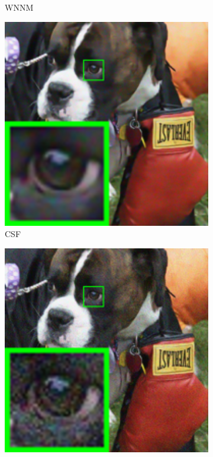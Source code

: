\begin{figure}
\begin{subfigure}[t]{0.19\textwidth}
\caption{WNNM}
    \end{subfigure}
    \hfill
    \begin{subfigure}[t]{0.19\textwidth}
        \centering
        \includegraphics[width=1\textwidth]{images/guided/resize_br_CSF_dog.png}
\caption{CSF}
    \end{subfigure}
\hfill
    \begin{subfigure}[t]{0.19\textwidth}
        \centering
        \includegraphics[width=1\textwidth]{images/guided/resize_br_TRD_dog.png}

\end{subfigure}
\end{figure}
